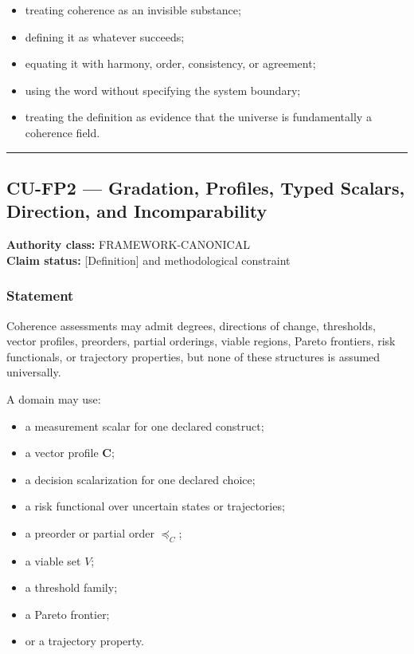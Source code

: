\documentclass[
  11pt,
]{article}
\providecommand{\tightlist}{%
  \setlength{\itemsep}{0pt}\setlength{\parskip}{0pt}}
\begin{document}
\begin{itemize}
\tightlist
\item
  treating coherence as an invisible substance;
\item
  defining it as whatever succeeds;
\item
  equating it with harmony, order, consistency, or agreement;
\item
  using the word without specifying the system boundary;
\item
  treating the definition as evidence that the universe is fundamentally
  a coherence field.
\end{itemize}

\begin{center}\rule{0.5\linewidth}{0.5pt}\end{center}

\subsection{CU-FP2 --- Gradation, Profiles, Typed Scalars, Direction,
and
Incomparability}\label{cu-fp2-gradation-profiles-typed-scalars-direction-and-incomparability}

\textbf{Authority class:} FRAMEWORK-CANONICAL\\
\textbf{Claim status:} {[}Definition{]} and methodological constraint

\subsubsection{Statement}\label{statement-1}

Coherence assessments may admit degrees, directions of change,
thresholds, vector profiles, preorders, partial orderings, viable
regions, Pareto frontiers, risk functionals, or trajectory properties,
but none of these structures is assumed universally.

A domain may use:

\begin{itemize}
\tightlist
\item
  a measurement scalar for one declared construct;
\item
  a vector profile \(\mathbf C\);
\item
  a decision scalarization for one declared choice;
\item
  a risk functional over uncertain states or trajectories;
\item
  a preorder or partial order \(\preceq_C\);
\item
  a viable set \(V\);
\item
  a threshold family;
\item
  a Pareto frontier;
\item
  or a trajectory property.
\end{itemize}
\end{document}
